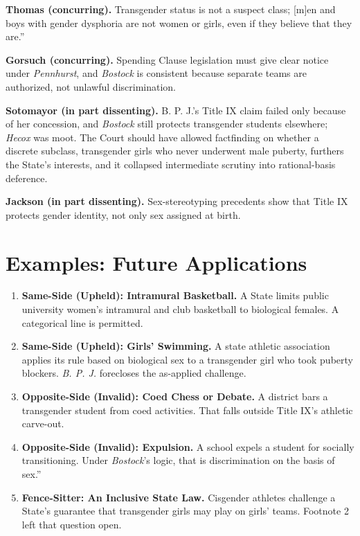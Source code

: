 \documentclass[12pt]{article}
\begin{document}
\textbf{Thomas (concurring).} Transgender status is not a suspect class; [m]en and boys with gender dysphoria are not women or girls, even if they believe that they are.''

\textbf{Gorsuch (concurring).} Spending Clause legislation must give clear notice under \textit{Pennhurst}, and \textit{Bostock} is consistent because separate teams are authorized, not unlawful discrimination.

\textbf{Sotomayor (in part dissenting).} B. P. J.'s Title IX claim failed only because of her concession, and \textit{Bostock} still protects transgender students elsewhere; \textit{Hecox} was moot. The Court should have allowed factfinding on whether a discrete subclass, transgender girls who never underwent male puberty, furthers the State's interests, and it collapsed intermediate scrutiny into rational-basis deference.

\textbf{Jackson (in part dissenting).} Sex-stereotyping precedents show that Title IX protects gender identity, not only sex assigned at birth.

\section{Examples: Future Applications}

\begin{enumerate}
\item \textbf{Same-Side (Upheld): Intramural Basketball.} A State limits public university women's intramural and club basketball to biological females. A categorical line is permitted.
\item \textbf{Same-Side (Upheld): Girls' Swimming.} A state athletic association applies its rule based on biological sex to a transgender girl who took puberty blockers. \textit{B. P. J.} forecloses the as-applied challenge.
\item \textbf{Opposite-Side (Invalid): Coed Chess or Debate.} A district bars a transgender student from coed activities. That falls outside Title IX's athletic carve-out.
\item \textbf{Opposite-Side (Invalid): Expulsion.} A school expels a student for socially transitioning. Under \textit{Bostock}'s logic, that is discrimination on the basis of sex.''
\item \textbf{Fence-Sitter: An Inclusive State Law.} Cisgender athletes challenge a State's guarantee that transgender girls may play on girls' teams. Footnote 2 left that question open.
\end{enumerate}
\end{document}
